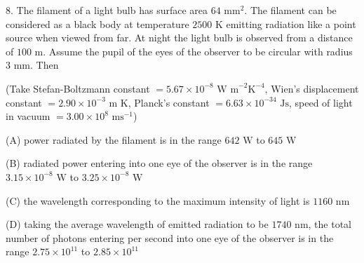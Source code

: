  8. The filament of a light bulb has surface area \(64\text{ mm}^2\). The filament can be considered as a black body at temperature \(2500\text{ K}\) emitting radiation like a point source when viewed from far. At night the light bulb is observed from a distance of \(100\text{ m}\). Assume the pupil of the eyes of the observer to be circular with radius \(3\text{ mm}\). Then 

(Take Stefan-Boltzmann constant \(=5.67\times10^{-8}\text{ W m}^{-2}\text{K}^{-4}\), Wien's displacement constant \(=2.90\times10^{-3}\text{ m K}\), Planck's constant \(=6.63\times10^{-34}\text{ Js}\), speed of light in vacuum \(=3.00\times10^8\text{ ms}^{-1}\))

(A) power radiated by the filament is in the range \(642\text{ W} \) to \(645\text{ W}\)

(B) radiated power entering into one eye of the observer is in the range \(3.15\times10^{-8}\text{ W}\) to \(3.25\times10^{-8}\text{ W}\)

(C) the wavelength corresponding to the maximum intensity of light is \(1160\text{ nm}\)

(D) taking the average wavelength of emitted radiation to be \(1740\text{ nm}\), the total number of photons entering per second into one eye of the observer is in the range \(2.75\times10^{11}\) to \(2.85\times10^{11}\)